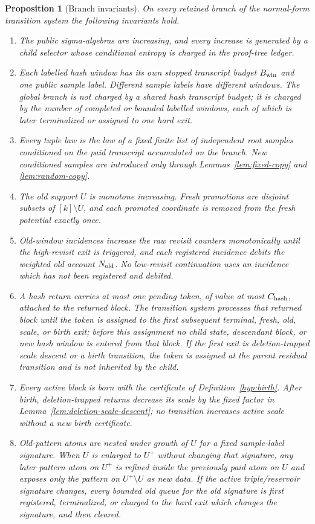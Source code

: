 \documentclass[11pt]{article}
\newtheorem{proposition}[theorem]{Proposition}
\begin{document}
\begin{proposition}[Branch invariants]
\label{prop:branch-invariants}
On every retained branch of the normal-form transition system the following
invariants hold.
\begin{enumerate}[label=\textup{(\roman*)}]
\item The public sigma-algebras are increasing, and every increase is generated
by a child selector whose conditional entropy is charged in the proof-tree
ledger.
\item Each labelled hash window has its own stopped transcript budget
$B_{\rm win}$ and one public sample label.  Different sample labels have
different windows.  The global branch is not charged by a shared hash transcript
budget; it is charged by the number of completed or bounded labelled windows,
each of which is later terminalized or assigned to one hard exit.
\item Every tuple law is the law of a fixed finite list of independent root
samples conditioned on the paid transcript accumulated on the branch.  New
conditioned samples are introduced only through Lemmas~\ref{lem:fixed-copy}
and \ref{lem:random-copy}.
\item The old support $U$ is monotone increasing.  Fresh promotions are
disjoint subsets of $[k]\setminus U$, and each promoted coordinate is removed
from the fresh potential exactly once.
\item Old-window incidences increase the raw revisit counters monotonically
until the high-revisit exit is triggered, and each registered incidence debits
the weighted old account $N_{\rm old}$.  No low-revisit continuation uses an
incidence which has not been registered and debited.
\item A hash return carries at most one pending token, of value at most
$C_{\rm hash}$, attached to the returned block.  The transition system processes
that returned block until the token is assigned to the first subsequent
terminal, fresh, old, scale, or birth exit; before this assignment no child
state, descendant block, or new hash window is entered from that block.  If the
first exit is deletion-trapped scale descent or a birth transition, the token is
assigned at the parent residual transition and is not inherited by the child.
\item Every active block is born with the certificate of
Definition~\ref{hyp:birth}.  After birth, deletion-trapped returns decrease
its scale by the fixed factor in Lemma~\ref{lem:deletion-scale-descent}; no
transition increases active scale without a new birth certificate.
\item Old-pattern atoms are nested under growth of $U$ for a fixed sample-label
signature.  When $U$ is enlarged to $U^+$ without changing that signature, any
later pattern atom on $U^+$ is refined inside the previously paid atom on $U$
and exposes only the pattern on $U^+\setminus U$ as new data.  If the active
triple/reservoir signature changes, every bounded old queue for the old
signature is first registered, terminalized, or charged to the hard exit which
changes the signature, and then cleared.
\end{enumerate}
\end{proposition}
\end{document}
